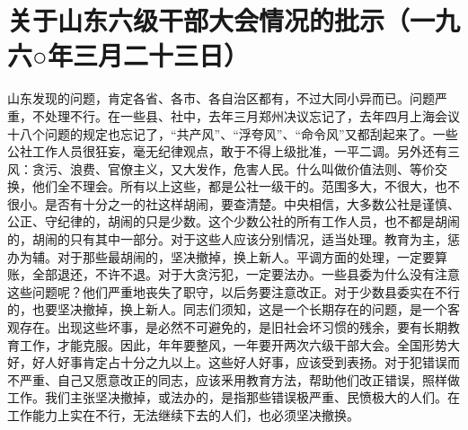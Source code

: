 \section[关于山东六级干部大会情况的批示（一九六○年三月二十三日）]{关于山东六级干部大会情况的批示（一九六○年三月二十三日）}


山东发现的问题，肯定各省、各市、各自治区都有，不过大同小异而已。问题严重，不处理不行。在一些县、社中，去年三月郑州决议忘记了，去年四月上海会议十八个问题的规定也忘记了，“共产风”、“浮夸风”、“命令风”又都刮起来了。一些公社工作人员很狂妄，毫无纪律观点，敢于不得上级批准，一平二调。另外还有三风：贪污、浪费、官僚主义，又大发作，危害人民。什么叫做价值法则、等价交换，他们全不理会。所有以上这些，都是公社一级干的。范围多大，不很大，也不很小。是否有十分之一的社这样胡闹，要查清楚。中央相信，大多数公社是谨慎、公正、守纪律的，胡闹的只是少数。这个少数公社的所有工作人员，也不都是胡闹的，胡闹的只有其中一部分。对于这些人应该分别情况，适当处理。教育为主，惩办为辅。对于那些最胡闹的，坚决撤掉，换上新人。平调方面的处理，一定要算账，全部退还，不许不退。对于大贪污犯，一定要法办。一些县委为什么没有注意这些问题呢？他们严重地丧失了职守，以后务要注意改正。对于少数县委实在不行的，也要坚决撤掉，换上新人。同志们须知，这是一个长期存在的问题，是一个客观存在。出现这些坏事，是必然不可避免的，是旧社会坏习惯的残余，要有长期教育工作，才能克服。因此，年年要整风，一年要开两次六级干部大会。全国形势大好，好人好事肯定占十分之九以上。这些好人好事，应该受到表扬。对于犯错误而不严重、自己又愿意改正的同志，应该釆用教育方法，帮助他们改正错误，照样做工作。我们主张坚决撤掉，或法办的，是指那些错误极严重、民愤极大的人们。在工作能力上实在不行，无法继续下去的人们，也必须坚决撤换。


